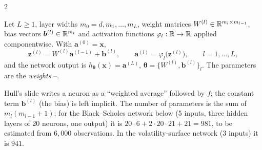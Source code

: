 \begin{paracol}{2}
\begin{definition}\label{ch16:def-nn}
Let $L\ge1$, layer widths $m_0=d,m_1,\dots,m_L$, weight matrices $W^{(l)}\in\mathbb{R}^{m_l\times m_{l-1}}$, bias vectors $\bm b^{(l)}\in\mathbb{R}^{m_l}$ and activation functions $\varphi_l:\mathbb{R}\to\mathbb{R}$ applied componentwise. With $\bm a^{(0)}=\bm x$,
\[
  \bm z^{(l)}=W^{(l)}\bm a^{(l-1)}+\bm b^{(l)},\qquad \bm a^{(l)}=\varphi_l\bigl(\bm z^{(l)}\bigr),\qquad l=1,\dots,L,
\]
and the network output is $h_{\bm\theta}(\bm x)=\bm a^{(L)}$, $\bm\theta=\{W^{(l)},\bm b^{(l)}\}_l$. The parameters are the \emph{weights}
--.
\end{definition}
Hull's slide writes a neuron as a ``weighted average'' followed by $f$; the constant term $\bm b^{(l)}$ (the bias) is left implicit. The number of parameters is the sum of $m_l(m_{l-1}+1)$; for the Black--Scholes network below (5 inputs, three hidden layers of 20 neurons,
one output) it is $20\cdot6+2\cdot20\cdot21+21=981$, to be estimated from $6{,}000$ observations. In the volatility-surface network (3 inputs) it is $941$.


\end{paracol}
